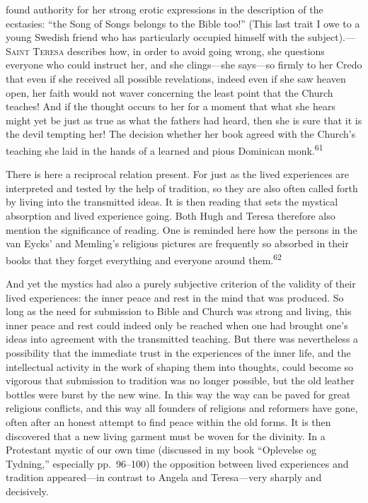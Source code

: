 \documentclass[12pt,a4paper]{book}
\newcommand{\opage}[1]{\marginnote{\footnotesize\textit{[#1]}}}
\begin{document}
found authority for her strong erotic expressions in the description of the ecstasies: ``the Song of
Songs belongs to the Bible too!'' (This last trait I owe to a young Swedish friend who has
particularly occupied himself with the subject).---\textsc{Saint Teresa} describes how, in order to
avoid going wrong, she questions everyone who could instruct her, and she clings---she says---so
firmly to her Credo that even if she received all possible revelations, indeed even if she saw heaven
open, her faith would not waver concerning the least point that the Church teaches! And if the thought
occurs to her for a moment that what she hears might yet be just as true as what the fathers had
heard, then 
\opage{119}she is sure that it is the devil tempting her! The decision whether her book agreed with
the Church's teaching she laid in the hands of a learned and pious Dominican monk.\textsuperscript{61}

There is here a reciprocal relation present. For just as the lived experiences are interpreted and
tested by the help of tradition, so they are also often called forth by living into the transmitted
ideas. It is then reading that sets the mystical absorption and lived experience going. Both Hugh and
Teresa therefore also mention the significance of reading. One is reminded here how the persons in the
van Eycks' and Memling's religious pictures are frequently so absorbed in their books that they forget
everything and everyone around them.\textsuperscript{62}

And yet the mystics had also a purely subjective criterion of the validity of their lived experiences:
the inner peace and rest in the mind that was produced. So long as the need for submission to Bible and
Church was strong and living, this inner peace and rest could indeed only be reached when one had
brought one's ideas into agreement with the transmitted teaching. But there was nevertheless a
possibility that the immediate trust in the experiences of the inner life, and the intellectual activity
in the work of shaping them into thoughts, could become so vigorous that submission to tradition was no
longer possible, but the old leather bottles were burst by the new wine. In this way the way can be
paved for great religious conflicts, and this way all founders of religions and reformers have gone,
often after an honest attempt to find peace within the old forms. It is then discovered that a new
living garment must be woven for the divinity. In a Protestant mystic of our own time (discussed in my
book ``Oplevelse og Tydning,'' especially pp.~96--100) the opposition between lived experiences and
tradition appeared---in contrast to Angela and Teresa---very sharply and decisively.
\end{document}
